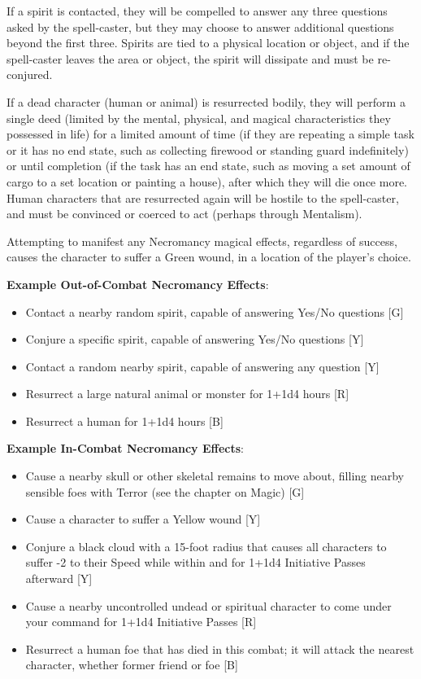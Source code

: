 \documentclass[oneside]{book}
\begin{document}
\begin{multicols}{2}
If a spirit is contacted, they will be compelled to answer any three questions asked by the spell-caster, but they may choose to answer additional questions beyond the first three. Spirits are tied to a physical location or object, and if the spell-caster leaves the area or object, the spirit will dissipate and must be re-conjured.
 
If a dead character (human or animal) is resurrected bodily, they will perform a single deed (limited by the mental, physical, and magical characteristics they possessed in life) for a limited amount of time (if they are repeating a simple task or it has no end state, such as collecting firewood or standing guard indefinitely) or until completion (if the task has an end state, such as moving a set amount of cargo to a set location or painting a house), after which they will die once more. Human characters that are resurrected again will be hostile to the spell-caster, and must be convinced or coerced to act (perhaps through Mentalism). 

Attempting to manifest any Necromancy magical effects, regardless of success, causes the character to suffer a Green wound, in a location of the player's choice.

\textbf{Example Out-of-Combat Necromancy Effects}:
	\begin{itemize}
		\setlength{\itemsep}{0cm}%
  		\setlength{\parskip}{0cm}%
		\item{ \small Contact a nearby random spirit, capable of answering Yes/No questions  [G]}
		\item{ \small Conjure a specific spirit, capable of answering Yes/No questions [Y]}
		\item{ \small Contact a random nearby spirit, capable of answering any question [Y]}
		\item{ \small Resurrect a large natural animal or monster for 1+1d4 hours [R]}
		\item{ \small Resurrect a human for 1+1d4 hours [B]}
	\end{itemize}
	
\textbf{Example In-Combat Necromancy Effects}:
	\begin{itemize}
		\setlength{\itemsep}{0cm}%
  		\setlength{\parskip}{0cm}%
		\item{ \small Cause a nearby skull or other skeletal remains to move about, filling nearby sensible foes with Terror (see the chapter on Magic)  [G]}
		\item{ \small Cause a character to suffer a Yellow wound  [Y]}
		\item{ \small Conjure a black cloud with a 15-foot radius that causes all characters to suffer -2 to their Speed while within and for 1+1d4 Initiative Passes afterward [Y]}
		\item{ \small Cause a nearby uncontrolled undead or spiritual character to come under your command for 1+1d4 Initiative Passes [R]}
		\item{ \small Resurrect a human foe that has died in this combat; it will attack the nearest character, whether former friend or foe [B]}
	\end{itemize}
 

\end{multicols}
\end{document}
